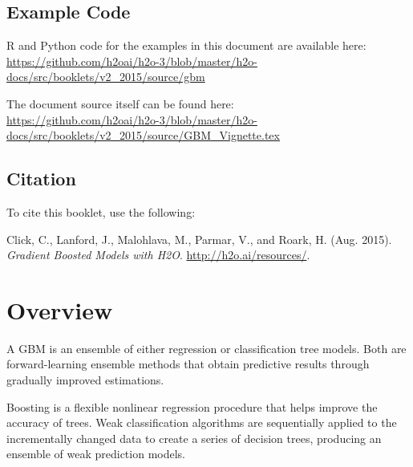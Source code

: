 


\newcommand{\waterVersion}{3.2.0.1}



\subsection{Example Code}

R and Python code for the examples in this document are available here:\\
\url{https://github.com/h2oai/h2o-3/blob/master/h2o-docs/src/booklets/v2_2015/source/gbm}

The document source itself can be found here:\\
\url{https://github.com/h2oai/h2o-3/blob/master/h2o-docs/src/booklets/v2_2015/source/GBM_Vignette.tex}

\subsection{Citation}

To cite this booklet, use the following: 

Click, C., Lanford, J., Malohlava, M., Parmar, V., and Roark, H. (Aug. 2015). \textit{Gradient Boosted Models with H2O}. \url{http://h2o.ai/resources/}. 

\newpage

\section{Overview}

A GBM is an ensemble of either regression or classification tree models.
Both are forward-learning ensemble methods that obtain predictive results through gradually improved estimations.

Boosting is a flexible nonlinear regression procedure that helps improve the accuracy of trees. Weak classification algorithms are sequentially applied to the incrementally changed data to create a series of decision trees, producing an ensemble of weak prediction models. 

